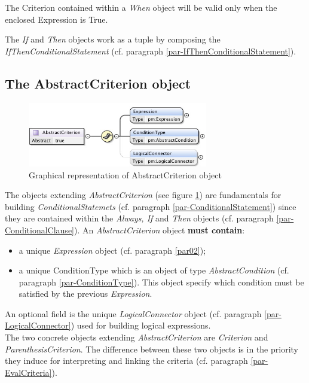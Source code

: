 \documentclass[a4paper,11pt] {ivoa}
\begin{document}
The Criterion contained within a {\it When} object will be valid only when the enclosed Expression
is True.

The {\it If} and {\it Then} objects work as a tuple by composing the  {\it
IfThenConditionalStatement} (cf. paragraph
\ref{par-IfThenConditionalStatement}).

\subsection{The AbstractCriterion object}\label{par-AbstractCriterion}
\begin{figure}[htbp]
\begin{center}
\includegraphics[width=0.7\textwidth]{pictures/AbstractCriterion.jpg} 
\caption{Graphical representation of AbstractCriterion object}
\label{Pic-AbstractCriterion}
\end{center}
\end{figure}
The objects extending {\it AbstractCriterion} (see figure \ref{Pic-AbstractCriterion}) are
fundamentals for building {\it ConditionalStatemets} (cf. paragraph \ref{par-ConditionalStatement})
since they are contained within the {\it Always, If} and {\it Then} objects (cf. paragraph
\ref{par-ConditionalClause}).
An {\it AbstractCriterion} object {\bf must contain}:
\begin{itemize}
\item a unique {\it Expression} object (cf. paragraph \ref{par02});
\item a unique ConditionType which is an object of type {\it AbstractCondition} (cf. paragraph 
\ref{par-ConditionType}).
This object specify which condition must be satisfied by the previous {\it Expression}.
\end{itemize}
An optional field is the unique {\it LogicalConnector} object (cf. paragraph
\ref{par-LogicalConnector}) used for building logical expressions.\\
The two concrete objects extending  {\it AbstractCriterion}  are {\it Criterion} and {\it
ParenthesisCriterion}.  The difference between these two objects is in the priority they induce for
interpreting and linking the criteria (cf. paragraph \ref{par-EvalCriteria}).
\end{document}

